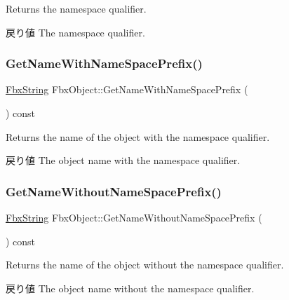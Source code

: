 Returns the namespace qualifier. \begin{DoxyReturn}{戻り値}
The namespace qualifier. 
\end{DoxyReturn}
\mbox{\label{class_fbx_object_a9caa594f866ea3a424f5f6e3676e2799}} 
\subsubsection{\texorpdfstring{Get\+Name\+With\+Name\+Space\+Prefix()}{GetNameWithNameSpacePrefix()}}
{\footnotesize\ttfamily \hyperlink{class_fbx_string}{Fbx\+String} Fbx\+Object\+::\+Get\+Name\+With\+Name\+Space\+Prefix (\begin{DoxyParamCaption}{ }\end{DoxyParamCaption}) const}

Returns the name of the object with the namespace qualifier. \begin{DoxyReturn}{戻り値}
The object name with the namespace qualifier. 
\end{DoxyReturn}
\mbox{\label{class_fbx_object_ae378979d85476e931375e30b6498f8db}} 
\subsubsection{\texorpdfstring{Get\+Name\+Without\+Name\+Space\+Prefix()}{GetNameWithoutNameSpacePrefix()}}
{\footnotesize\ttfamily \hyperlink{class_fbx_string}{Fbx\+String} Fbx\+Object\+::\+Get\+Name\+Without\+Name\+Space\+Prefix (\begin{DoxyParamCaption}{ }\end{DoxyParamCaption}) const}

Returns the name of the object without the namespace qualifier. \begin{DoxyReturn}{戻り値}
The object name without the namespace qualifier. 
\end{DoxyReturn}
\mbox{\label{class_fbx_object_a34e7ffc0f49a4e3be8db6310efccd020}} 
